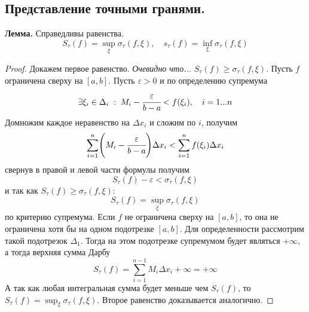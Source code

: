 \documentclass{article}
\newcommand*{\lemma}[1]{\textbf{Лемма.} #1. \newline}
\begin{document}
\subsection{Представление точными гранями.}
\lemma{Справедливы равенства}
$$
    S_\tau(f) = \displaystyle \sup_{\xi} \sigma_\tau (f, \xi), \quad s_\tau(f) = \displaystyle \inf_{\xi}\sigma_\tau(f, \xi) 
$$
\begin{proof}
    Докажем первое равенство. 
    \newline 
    \textit{Очевидно что...} $S_\tau(f) \geq \sigma_\tau(f, \xi)$. Пусть $f$ ограничена сверху на $[a, b]$. Пусть $\varepsilon > 0$ и по определению супремума
    $$
        \exists \xi_i \in \Delta_i \; : \; M_i - \cfrac{\varepsilon}{b - a} < f(\xi_i), \quad i = 1...n
    $$
    Домножим каждое неравенство на $\Delta x_i$ и сложим по $i$, получим
    $$
        \sum_{i = 1}^{n} \Biggl( M_i - \cfrac{\varepsilon}{b - a} \Biggr) \Delta x_i < \sum_{i = 1}^{n}f(\xi_i)\Delta x_i
    $$
    свернув в правой и левой части формулы получим
    $$
        S_\tau(f) - \varepsilon < \sigma_\tau(f, \xi)
    $$
    и так как $S_\tau(f) \geq \sigma_\tau(f, \xi)$:
    $$
        S_\tau(f) = \displaystyle \sup_{\xi} \sigma_\tau(f, \xi)
    $$
    по критерию супремума.
    \newline 
    Если $f$ не ограничена сверху на $[a, b]$, то она не ограничена хотя бы на одном подотрезке $[a, b]$. Для определенности рассмотрим такой подотрезок $\Delta_1$. Тогда на этом подотрезке супремумом будет являться $+\infty$, а тогда верхняя сумма Дарбу
    $$
        S_\tau(f) = \sum_{i = 1}^{n-1}M_i \Delta x_i + \infty = +\infty
    $$
    А так как любая интегральная сумма будет меньше чем $S_\tau(f)$, то $S_\tau(f) = \displaystyle \sup_{\xi}\sigma_\tau(f, \xi)$.
    \newline 
    Второе равенство доказывается аналогично.
\end{proof}
\end{document}
